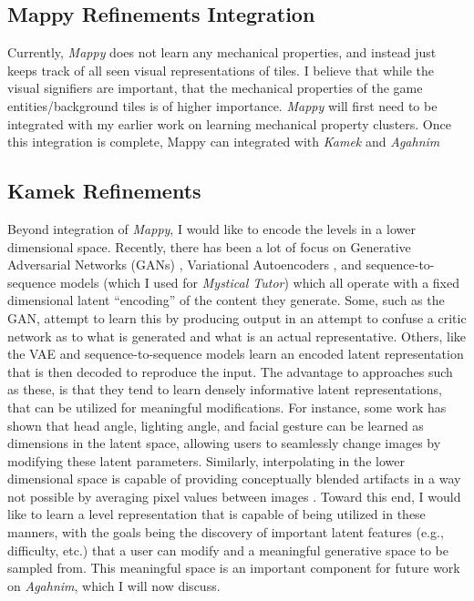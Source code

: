 \documentclass[12pt]{report}
\begin{document}
\subsection*{Mappy Refinements Integration}

 Currently, \textit{Mappy} does not learn any mechanical properties, and instead just keeps track of all seen visual representations of tiles.  I believe that while the visual signifiers are important, that the mechanical properties of the game entities/background tiles is of higher importance. \textit{Mappy} will first need to be integrated with my earlier work on learning mechanical property clusters. Once this integration is complete, Mappy can integrated with \textit{Kamek} and \textit{Agahnim}

\subsection*{Kamek Refinements}

Beyond integration of \textit{Mappy}, 
I would like to encode the levels in a lower dimensional space.  Recently, there has been a lot of focus on Generative Adversarial Networks (GANs) \cite{gans}, Variational Autoencoders \cite{vae}, and sequence-to-sequence models \cite{seq2seq} (which I used for \textit{Mystical Tutor}) which all operate with a fixed dimensional latent ``encoding'' of the content they generate.  Some, such as the GAN, attempt to learn this by producing output in an attempt to confuse a critic network as to what is generated and what is an actual representative. Others, like the VAE and sequence-to-sequence models learn an encoded latent representation that is then decoded to reproduce the input.  The advantage to approaches such as these, is that they tend to learn densely informative latent representations, that can be utilized for meaningful modifications.  For instance, some work has shown that head angle, lighting angle, and facial gesture \cite{ganstuff} can be learned as dimensions in the latent space, allowing users to seamlessly change images by modifying these latent parameters.  Similarly, interpolating in the lower dimensional space is capable of providing conceptually blended artifacts in a way not possible by averaging pixel values between images \cite{ganinterpolation}.  Toward this end, I would like to learn a level representation that is capable of being utilized in these manners, with the goals being the discovery of important latent features (e.g., difficulty, etc.) that a user can modify and a meaningful generative space to be sampled from.  This meaningful space is an important component for future work on \textit{Agahnim}, which I will now discuss.
\end{document}
